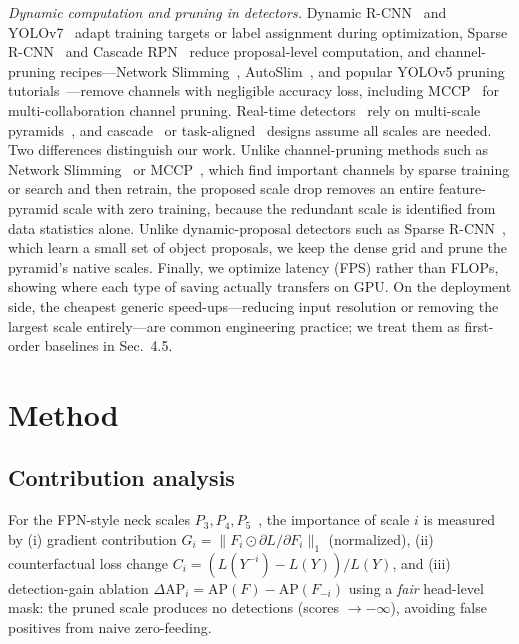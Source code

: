 \documentclass[times,twocolumn,final,authoryear]{elsarticle}
\begin{document}
\emph{Dynamic computation and pruning in detectors.} Dynamic R-CNN~\cite{zhang2020dynamicrcnn} and YOLOv7~\cite{wang2023yolov7} adapt training targets or label assignment during optimization, Sparse R-CNN~\cite{sun2021sparsercnn} and Cascade RPN~\cite{vu2019cascaderpn} reduce proposal-level computation, and channel-pruning recipes---Network Slimming~\cite{liu2017networkslimming}, AutoSlim~\cite{yu2020autoslim}, and popular YOLOv5 pruning tutorials~\cite{ultralytics2023yolov5}---remove channels with negligible accuracy loss, including MCCP~\cite{yan2023mccp} for multi-collaboration channel pruning. Real-time detectors~\cite{redmon2016yolo,tian2019fcos,lin2017focal,jocher2026ultralyticsyolo26unifiedrealtime} rely on multi-scale pyramids~\cite{lin2017fpn}, and cascade~\cite{cai2018cascade} or task-aligned~\cite{feng2021tood} designs assume all scales are needed. Two differences distinguish our work. Unlike channel-pruning methods such as Network Slimming~\cite{liu2017networkslimming} or MCCP~\cite{yan2023mccp}, which find important channels by sparse training or search and then retrain, the proposed scale drop removes an entire feature-pyramid scale with zero training, because the redundant scale is identified from data statistics alone. Unlike dynamic-proposal detectors such as Sparse R-CNN~\cite{sun2021sparsercnn}, which learn a small set of object proposals, we keep the dense grid and prune the pyramid's native scales. Finally, we optimize latency (FPS) rather than FLOPs, showing where each type of saving actually transfers on GPU. On the deployment side, the cheapest generic speed-ups---reducing input resolution or removing the largest scale entirely---are common engineering practice; we treat them as first-order baselines in Sec.~4.5.
\section{Method}\label{sec:method}
\subsection{Contribution analysis}
For the FPN-style neck scales $P_3,P_4,P_5$~\cite{lin2017fpn}, the importance of scale $i$ is measured by (i) gradient contribution $G_i=\|F_i\odot\partial L/\partial F_i\|_1$ (normalized), (ii) counterfactual loss change $C_i=(L(Y^{-i})-L(Y))/L(Y)$, and (iii) detection-gain ablation $\Delta\text{AP}_i=\text{AP}(F)-\text{AP}(F_{-i})$ using a \emph{fair} head-level mask: the pruned scale produces no detections (scores $\to-\infty$), avoiding false positives from naive zero-feeding.
\end{document}
